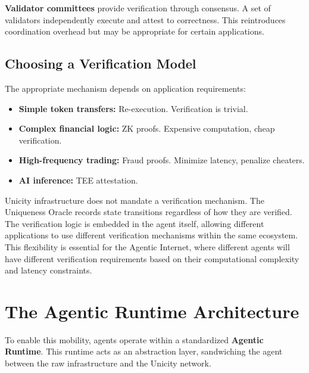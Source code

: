 \documentclass{article}
\begin{document}
\textbf{Validator committees} provide verification through consensus. A set of validators independently execute and attest to correctness. This reintroduces coordination overhead but may be appropriate for certain applications.

\subsection{Choosing a Verification Model}

The appropriate mechanism depends on application requirements:

\begin{itemize}
    \item \textbf{Simple token transfers:}
    Re-execution. Verification is trivial.

    \item \textbf{Complex financial logic:}
    ZK proofs. Expensive computation, cheap verification.

    \item \textbf{High-frequency trading:}
    Fraud proofs. Minimize latency, penalize cheaters.

    \item \textbf{AI inference:}
    TEE attestation.
\end{itemize}

Unicity infrastructure does not mandate a verification mechanism. The Uniqueness Oracle records state transitions regardless of how they are verified. The verification logic is embedded in the agent itself, allowing different applications to use different verification mechanisms within the same ecosystem.
This flexibility is essential for the Agentic Internet, where different agents will have different verification requirements based on their computational complexity and  latency constraints.

\section{The Agentic Runtime Architecture}

To enable this mobility, agents operate within a standardized \textbf{Agentic Runtime}. This runtime acts as an abstraction layer, sandwiching the agent between the raw infrastructure and the Unicity network.
\end{document}
